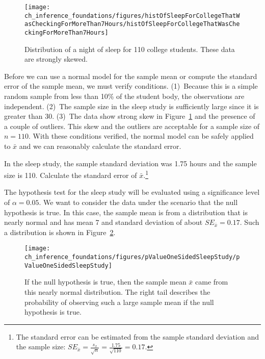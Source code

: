 \begin{figure}
\centering
\texttt{[image: ch\_inference\_foundations/figures/histOfSleepForCollegeThatWasCheckingForMoreThan7Hours/histOfSleepForCollegeThatWasCheckingForMoreThan7Hours]}
\caption{Distribution of a night of sleep for 110 college students. These data are strongly skewed.}
\label{histOfSleepForCollegeThatWasCheckingForMoreThan7Hours}
\end{figure}

Before we can use a normal model for the sample mean or compute the standard error of the sample mean, we must verify conditions. (1)~Because this is a simple random sample from less than 10\% of the student body, the observations are independent. (2)~The sample size in the sleep study is sufficiently large since it is greater than 30. (3)~The data show strong skew in Figure~\ref{histOfSleepForCollegeThatWasCheckingForMoreThan7Hours} and the presence of a couple of outliers. This skew and the outliers are acceptable for a sample size of $n=110$. With these conditions verified, the normal model can be safely applied to $\bar{x}$ and we can reasonably calculate the standard error.

\begin{exercise} \label{findSEOfFirstSleepStudyCheckingGreaterThan7Hours}
In the sleep study, the sample standard deviation was 1.75 hours and the sample size is 110. Calculate the standard error of $\bar{x}$.\footnote{The standard error can be estimated from the sample standard deviation and the sample size: $SE_{\bar{x}} = \frac{s_x}{\sqrt{n}} = \frac{1.75}{\sqrt{110}} = 0.17$.}
\end{exercise}

The hypothesis test for the sleep study will be evaluated using a significance level of $\alpha = 0.05$. We want to consider the data under the scenario that the null hypothesis is true. In this case, the sample mean is from a distribution that is nearly normal and has mean 7 and standard deviation of about $SE_{\bar{x}} = 0.17$. Such a distribution is shown in Figure~\ref{pValueOneSidedSleepStudy}.

\begin{figure}[hht]
   \centering
   \texttt{[image: ch\_inference\_foundations/figures/pValueOneSidedSleepStudy/pValueOneSidedSleepStudy]}
   \caption{If the null hypothesis is true, then the sample mean $\bar{x}$ came from this nearly normal distribution. The right tail describes the probability of observing such a large sample mean if the null hypothesis is true.}
   \label{pValueOneSidedSleepStudy}
\end{figure}

